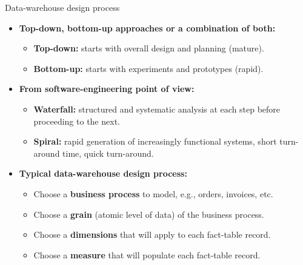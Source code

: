 \documentclass[aspectratio=169,t]{beamer}
\begin{document}
  { 
    \begin{frame}{Data-warehouse design process}
        \begin{itemize}
            \item \textbf{Top-down, bottom-up approaches or a combination of both:}
            \begin{itemize}
              \item \textbf{\color{airforceblue}Top-down:} starts with overall design and planning (mature).
              \item \textbf{\color{airforceblue}Bottom-up:} starts with experiments and prototypes (rapid).
            \end{itemize}
            \item \textbf{From software-engineering point of view:}
            \begin{itemize}
              \item \textbf{\color{airforceblue}Waterfall:} structured and systematic analysis at each step before proceeding to the next.
              \item \textbf{\color{airforceblue}Spiral:} rapid generation of increasingly functional systems, short turn-around time, quick turn-around.
            \end{itemize}
            \item \textbf{Typical data-warehouse design process:}
            \begin{itemize}
              \item Choose a \textbf{\color{airforceblue}business process} to model, e.g., orders, invoices, etc.
              \item Choose a \textbf{\color{airforceblue}grain} (atomic level of data) of the business process.
              \item Choose a \textbf{\color{airforceblue}dimensions} that will apply to each fact-table record.
              \item Choose a \textbf{\color{airforceblue}measure} that will populate each fact-table record.
            \end{itemize}
        \end{itemize}
    \end{frame}
  }
\end{document}
